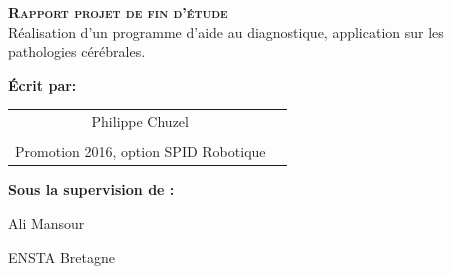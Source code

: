 
\begingroup
\thispagestyle{empty}
\begin{center}
\vspace*{2cm}
{\Huge \textsc{\textbf{Rapport projet de fin d'étude}}}\\


\vspace*{2cm}
{\huge Réalisation d'un programme d'aide au diagnostique, application sur les pathologies cérébrales.}\par %
\end{center}

\vspace*{1.5cm}
\textbf{\large Écrit par:} 
\begin{center}
{\huge 
\begin{tabular}{cc}
\\
Philippe Chuzel\\
\\
Promotion 2016, option SPID Robotique
\end{tabular}}
\end{center}


\vspace*{0.5 cm}
{\large \textbf{Sous la supervision de :}}\\
\begin{center}
{\large
Ali Mansour}
\end{center}

\vspace*{0.5 cm}
\begin{center}
{\large
ENSTA Bretagne}
\end{center}
\endgroup
